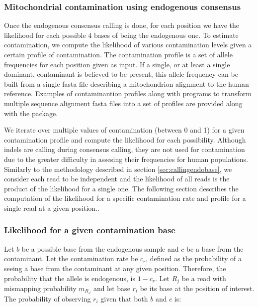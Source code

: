 \documentclass[a4paper,12pt]{article}
\begin{document}
\subsubsection{Mitochondrial contamination using endogenous consensus}

\label{sec:contestondb}


Once the endogenous consensus calling is done, for each position we have the likelihood for each possible 4 bases of being the endogenous one. To estimate contamination, we compute the likelihood of various contamination levels given a certain profile of contamination. The contamination profile is a set of allele frequencies for each position given as input. If a single, or at least a single dominant, contaminant is believed to be present, this allele frequency can be built from a single fasta file describing a mitochondrion alignment to the human reference.  Examples of contaminantion profiles along with programs to transform multiple sequence alignment fasta files into a set of profiles are provided along with the package. 

We iterate over multiple values of contamination (between 0 and 1) for a given contamination profile and compute the likelihood for each possibility. Although indels are calling during consensus calling, they are not used for contamination due to the greater difficulty in assesing their frequencies for human populations. Similarly to the methodology described in section \ref{sec:callingendobase}, we consider each read to be independent and the likelihood of all reads is the product of the likelihood for a single one. The following section describes the computation of the likelihood for a specific contamination rate and profile for a single read at a given position.. 


\subsubsection{Likelihood for a given contamination base}

Let $b$ be a possible base from the endogenous sample and $c$ be a base from the contaminant. Let the contamination rate be $c_r$, defined as the probability of a seeing a base from the contaminant at any given position. Therefore, the probability that the allele is endogenous, is $1-c_r$. Let $R_j$ be a read with mismapping probability $m_{R_J}$ and let base $r_i$ be its base at the position of interest. The probability of observing $r_i$ given that both $b$ and $c$ is:
\end{document}
